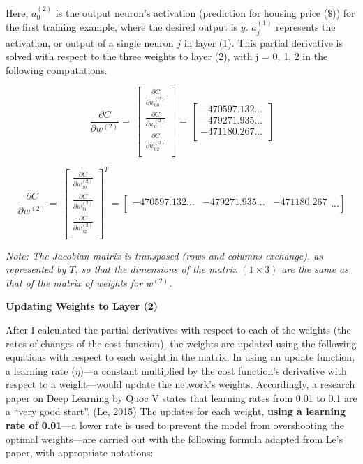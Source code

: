 \documentclass[12pt,a4paper]{article}
\begin{document}
Here, $a_0^{\left(2\right)}$ is the output neuron’s activation (prediction for housing price ($\$$)) for the first training example, where the desired output is $y$. $a_j^{\left(1\right)}$ represents the activation, or output of a single neuron $j$ in layer (1). This partial derivative is solved with respect to the three weights to layer (2), with j = 0, 1, 2 in the following computations.

\begin{equation}
\frac{\partial C}{\partial w^{\left(2\right)}}=\ \left[\begin{matrix}\frac{\partial C}{\partial w_{00}^{\left(2\right)}}\\\frac{\partial C}{\partial w_{01}^{\left(2\right)}}\\\frac{\partial C}{\partial w_{02}^{\left(2\right)}}\\\end{matrix}\right]=\left[\begin{matrix}-470597.132...\\-479271.935...\\-471180.267...\\\end{matrix}\right] 
\end{equation}

\begin{equation}
\frac{\partial C}{\partial w^{\left(2\right)}}=\ \left[\begin{matrix}\frac{\partial C}{\partial w_{00}^{\left(2\right)}}\\\frac{\partial C}{\partial w_{01}^{\left(2\right)}}\\\frac{\partial C}{\partial w_{02}^{\left(2\right)}}\\\end{matrix}\right]^T=\left[\begin{matrix}-470597.132...&-479271.935...&-471180.267\\\end{matrix}...\right] 
\end{equation}

\textit{Note: The Jacobian matrix is transposed (rows and columns exchange), as represented by $T$, so that the dimensions of the matrix $(1 \times 3)$ are the same as that of the matrix of weights for $w^{(2)}$.}

\hspace{}

\textbf{Updating Weights to Layer (2)}

After I calculated the partial derivatives with respect to each of the weights (the rates of changes of the cost function), the weights are updated using the following equations with respect to each weight in the matrix. In using an update function, a learning rate ($\eta$)—a constant multiplied by the cost function’s derivative with respect to a weight—would update the network’s weights. Accordingly, a research paper on Deep Learning by Quoc V states that learning rates from 0.01 to 0.1 are a “very good start”. (Le, 2015) The updates for each weight, \textbf{using a learning rate of 0.01}—a lower rate is used to prevent the model from overshooting the optimal weights—are carried out with the following formula adapted from Le’s paper, with appropriate notations:
\end{document}
